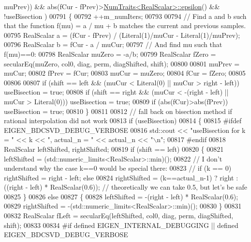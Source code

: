 \begin{DoxyCode}
      muPrev)) && abs(fCur - fPrev)>\hyperlink{group___core___module_struct_eigen_1_1_num_traits}{NumTraits<RealScalar>::epsilon}() && !useBisection
      )
00791     \{
00792       ++m\_numIters;
00793 
00794       \textcolor{comment}{// Find a and b such that the function f(mu) = a / mu + b matches the current and previous samples.}
00795       RealScalar a = (fCur - fPrev) / (Literal(1)/muCur - Literal(1)/muPrev);
00796       RealScalar b = fCur - a / muCur;
00797       \textcolor{comment}{// And find mu such that f(mu)==0:}
00798       RealScalar muZero = -a/b;
00799       RealScalar fZero = secularEq(muZero, col0, diag, perm, diagShifted, shift);
00800       
00801       muPrev = muCur;
00802       fPrev = fCur;
00803       muCur = muZero;
00804       fCur = fZero;
00805       
00806       
00807       \textcolor{keywordflow}{if} (shift == left  && (muCur < Literal(0) || muCur > right - left)) useBisection = \textcolor{keyword}{true};
00808       \textcolor{keywordflow}{if} (shift == right && (muCur < -(right - left) || muCur > Literal(0))) useBisection = \textcolor{keyword}{true};
00809       \textcolor{keywordflow}{if} (abs(fCur)>abs(fPrev)) useBisection = \textcolor{keyword}{true};
00810     \}
00811 
00812     \textcolor{comment}{// fall back on bisection method if rational interpolation did not work}
00813     \textcolor{keywordflow}{if} (useBisection)
00814     \{
00815 \textcolor{preprocessor}{#ifdef  EIGEN\_BDCSVD\_DEBUG\_VERBOSE}
00816       std::cout << \textcolor{stringliteral}{"useBisection for k = "} << k << \textcolor{stringliteral}{", actual\_n = "} << actual\_n << \textcolor{stringliteral}{"\(\backslash\)n"};
00817 \textcolor{preprocessor}{#endif}
00818       RealScalar leftShifted, rightShifted;
00819       \textcolor{keywordflow}{if} (shift == left)
00820       \{
00821         leftShifted = (std::numeric\_limits<RealScalar>::min)();
00822         \textcolor{comment}{// I don't understand why the case k==0 would be special there:}
00823         \textcolor{comment}{// if (k == 0) rightShifted = right - left; else }
00824         rightShifted = (k==actual\_n-1) ? right : ((right - left) * RealScalar(0.6)); \textcolor{comment}{// theoretically we
       can take 0.5, but let's be safe}
00825       \}
00826       \textcolor{keywordflow}{else}
00827       \{
00828         leftShifted = -(right - left) * RealScalar(0.6);
00829         rightShifted = -(std::numeric\_limits<RealScalar>::min)();
00830       \}
00831       
00832       RealScalar fLeft = secularEq(leftShifted, col0, diag, perm, diagShifted, shift);
00833 
00834 \textcolor{preprocessor}{#if defined EIGEN\_INTERNAL\_DEBUGGING || defined EIGEN\_BDCSVD\_DEBUG\_VERBOSE}

\end{DoxyCode}
